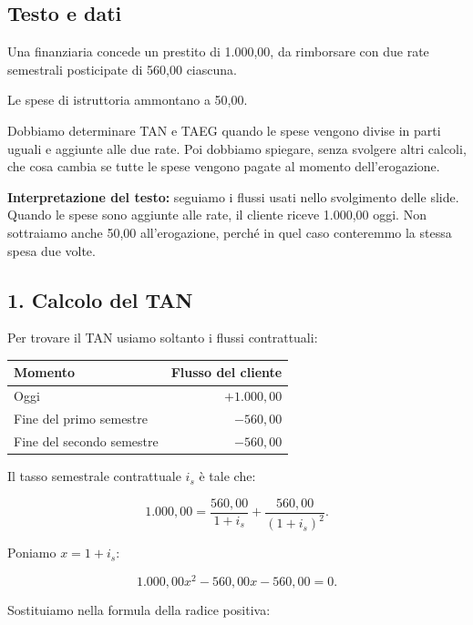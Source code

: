 \subsection*{Testo e dati}

\noindent Una finanziaria concede un prestito
di 1.000,00, da rimborsare con due rate semestrali
posticipate di 560,00 ciascuna.

\noindent Le spese di istruttoria ammontano a 50,00.

\noindent Dobbiamo determinare TAN e TAEG
quando le spese vengono divise in parti uguali
e aggiunte alle due rate.
Poi dobbiamo spiegare, senza svolgere altri calcoli,
che cosa cambia se tutte le spese vengono pagate
al momento dell'erogazione.

\medskip

\noindent \textbf{Interpretazione del testo:}
seguiamo i flussi usati nello svolgimento delle slide.
Quando le spese sono aggiunte alle rate,
il cliente riceve 1.000,00 oggi.
Non sottraiamo anche 50,00 all'erogazione,
perché in quel caso conteremmo la stessa spesa due volte.


\subsection*{1. Calcolo del TAN}

\noindent Per trovare il TAN
usiamo soltanto i flussi contrattuali:

\begin{center}
    \begin{tabular}{|l|r|}
        \hline
        \textbf{Momento} & \textbf{Flusso del cliente} \\
        \hline
        Oggi & $+1.000{,}00$ \\
        Fine del primo semestre & $-560{,}00$ \\
        Fine del secondo semestre & $-560{,}00$ \\
        \hline
    \end{tabular}
\end{center}

\noindent Il tasso semestrale contrattuale $i_s$ è tale che:

\[
1.000{,}00
=
\frac{560{,}00}{1+i_s}
+
\frac{560{,}00}{(1+i_s)^2}.
\]

\noindent Poniamo $x=1+i_s$:

\[
1.000{,}00x^2-560{,}00x-560{,}00=0.
\]

\noindent Sostituiamo nella formula della radice positiva:

